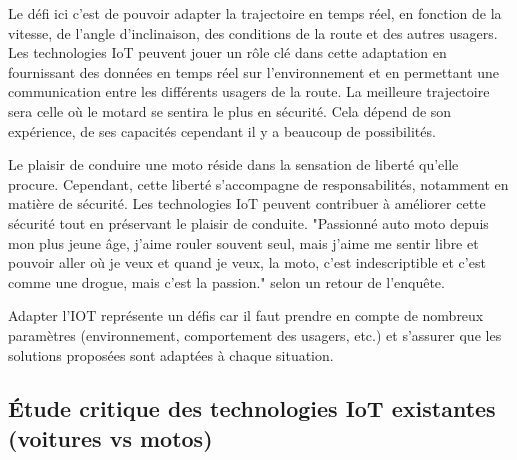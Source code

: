 \vspace{0.5cm}



Le défi ici c'est de pouvoir adapter la trajectoire en temps réel, en fonction de la vitesse, de l'angle d'inclinaison, des conditions de la route et des autres usagers. Les technologies IoT peuvent jouer un rôle clé dans cette adaptation en fournissant des données en temps réel sur l'environnement et en permettant une communication entre les différents usagers de la route. La meilleure trajectoire sera celle où le motard se sentira le plus en sécurité. Cela dépend de son expérience, de ses capacités cependant il y a beaucoup de possibilités.


\vspace{0.5cm}
Le plaisir de conduire une moto réside dans la sensation de liberté qu'elle procure. Cependant, cette liberté s'accompagne de responsabilités, notamment en matière de sécurité. Les technologies IoT peuvent contribuer à améliorer cette sécurité tout en préservant le plaisir de conduite. "Passionné auto moto depuis mon plus jeune âge, j'aime rouler souvent seul, mais j'aime me sentir libre et pouvoir aller où je veux et quand je veux, la moto, c'est indescriptible et c'est comme une drogue, mais c'est la passion." selon un retour de l'enquête.

\vspace{0.5cm}
Adapter l'IOT représente un défis car il faut prendre en compte de nombreux paramètres (environnement, comportement des usagers, etc.) et s'assurer que les solutions proposées sont adaptées à chaque situation.

\newpage
\subsection{ Étude critique des technologies IoT existantes (voitures vs motos)}
 \\

